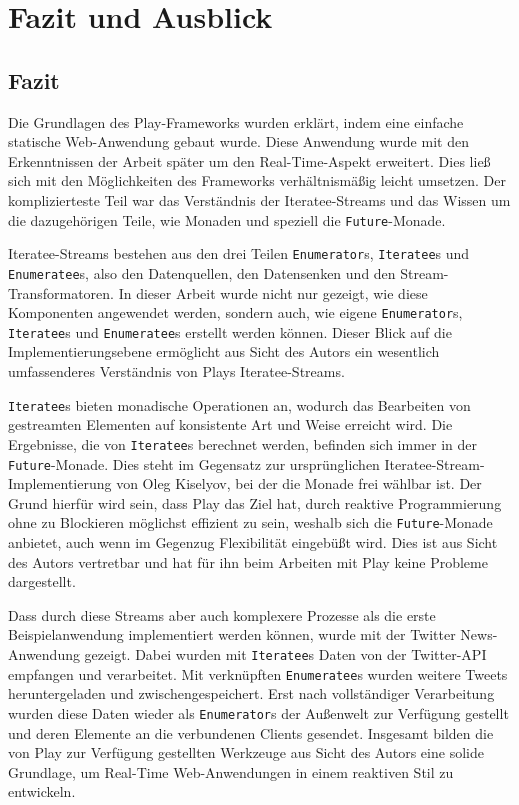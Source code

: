 
\chapter{Fazit und Ausblick} %
\label{cha:fazit_und_ausblick}

\section{Fazit} %
\label{sec:fazit}

Die Grundlagen des Play-Frameworks wurden erklärt, indem eine einfache statische Web-Anwendung gebaut wurde.
Diese Anwendung wurde mit den Erkenntnissen der Arbeit später um den Real-Time-Aspekt erweitert.
Dies ließ sich mit den Möglichkeiten des Frameworks verhältnismäßig leicht umsetzen.
Der komplizierteste Teil war das Verständnis der Iteratee-Streams und das Wissen um die dazugehörigen Teile, wie Monaden und speziell die \lstinline|Future|-Monade.

Iteratee-Streams bestehen aus den drei Teilen \lstinline|Enumerator|s, \lstinline|Iteratee|s und \lstinline|Enumeratee|s, also den Datenquellen, den Datensenken und den Stream-Transformatoren.
In dieser Arbeit wurde nicht nur gezeigt, wie diese Komponenten angewendet werden, sondern auch, wie eigene \lstinline|Enumerator|s, \lstinline|Iteratee|s und \lstinline|Enumeratee|s erstellt werden können.
Dieser Blick auf die Implementierungsebene ermöglicht aus Sicht des Autors ein wesentlich umfassenderes Verständnis von Plays Iteratee-Streams.

\lstinline|Iteratee|s bieten monadische Operationen an, wodurch das Bearbeiten von gestreamten Elementen auf konsistente Art und Weise erreicht wird.
Die Ergebnisse, die von \lstinline|Iteratee|s berechnet werden, befinden sich immer in der \lstinline|Future|-Monade.
Dies steht im Gegensatz zur ursprünglichen Iteratee-Stream-Implementierung von Oleg Kiselyov, bei der die Monade frei wählbar ist.
Der Grund hierfür wird sein, dass Play das Ziel hat, durch reaktive Programmierung ohne zu Blockieren möglichst effizient zu sein, weshalb sich die \lstinline|Future|-Monade anbietet, auch wenn im Gegenzug Flexibilität eingebüßt wird.
Dies ist aus Sicht des Autors vertretbar und hat für ihn beim Arbeiten mit Play keine Probleme dargestellt.

Dass durch diese Streams aber auch komplexere Prozesse als die erste Beispielanwendung implementiert werden können, wurde mit der Twitter News-Anwendung gezeigt.
Dabei wurden mit \lstinline|Iteratee|s Daten von der Twitter-API empfangen und verarbeitet.
Mit verknüpften \lstinline|Enumeratee|s wurden weitere Tweets heruntergeladen und zwischengespeichert.
Erst nach vollständiger Verarbeitung wurden diese Daten wieder als \lstinline|Enumerator|s der Außenwelt zur Verfügung gestellt und deren Elemente an die verbundenen Clients gesendet.
Insgesamt bilden die von Play zur Verfügung gestellten Werkzeuge aus Sicht des Autors eine solide Grundlage, um Real-Time Web-Anwendungen in einem reaktiven Stil zu entwickeln.


